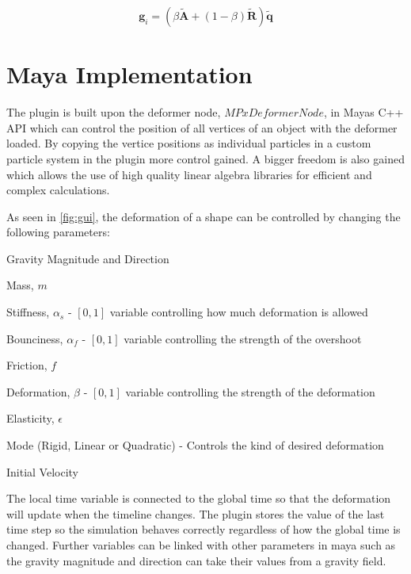     \begin{equation} \label{eq:newGoal}
        \mathbf{g}_i = (\beta\mathbf{\tilde{A}} + (1 - \beta)\mathbf{\tilde{R}})\mathbf{\tilde{q}}
    \end{equation}
    

\section{Maya Implementation}

The plugin is built upon the deformer node, $MPxDeformerNode$, in Mayas C++ API which can control the position of all vertices of an object with the deformer loaded. By copying the vertice positions as individual particles in a custom particle system in the plugin more control gained. A bigger freedom is also gained which allows the use of high quality linear algebra libraries for efficient and complex calculations. 

As seen in \ref{fig:gui}, the deformation of a shape can be controlled by changing the following parameters:

\begin{myitemize} 
  \item Gravity Magnitude and Direction 
  \item Mass, $m$
  \item Stiffness, $\alpha_s$ - $[0,1]$ variable controlling how much deformation is allowed
  \item Bounciness, $\alpha_f$ - $[0,1]$ variable controlling the strength of the overshoot
  \item Friction, $f$
  \item Deformation, $\beta$ - $[0,1]$ variable controlling the strength of the deformation
  \item Elasticity, $\epsilon$
  \item Mode (Rigid, Linear or Quadratic) - Controls the kind of desired deformation 
  \item Initial Velocity 
\end{myitemize}

The local time variable is connected to the global time so that the deformation will update when the timeline changes. The plugin stores the value of the last time step so the simulation behaves correctly regardless of how the global time is changed. Further variables can be linked with other parameters in maya such as the gravity magnitude and direction can take their values from a gravity field.

